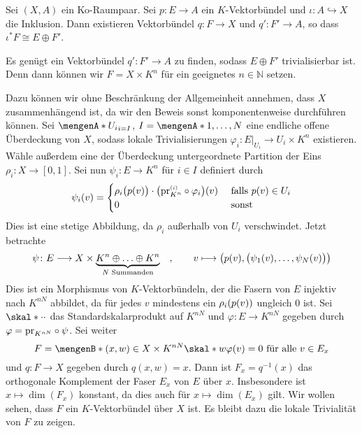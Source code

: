 \begin{lemma}[label=sub:38]
Sei $(X,A)$ ein Ko-Raumpaar. Sei $p \colon E \to A$ ein $K$-Vektorbündel und $\iota \colon A \hookrightarrow X$ die Inklusion. Dann existieren Vektorbündel $q \colon F \to X$
und $q' \colon F' \to A$, so dass $\iota^* F \cong E \oplus F'$.	
\end{lemma}
\begin{beweis}
Es genügt ein Vektorbündel $q' \colon F' \to A $ zu finden, sodass $E \oplus F'$ trivialisierbar ist. 
Denn dann können wir $F = X \times K^n$ für ein geeignetes $n \in \mathds{N}$ setzen.

Dazu können wir ohne Beschränkung der Allgemeinheit annehmen, dass $X$ zusammenhängend ist, da wir den Beweis sonst komponentenweise durchführen können. Sei 
$\set{U_i}_{i=I}$, $I=\set{1,\ldots,N}$ eine endliche offene Überdeckung von $X$, sodass lokale Trivialisierungen $\varphi_i \colon E|_{U_i} \to U_i \times K^n$ existieren. 
Wähle außerdem eine der Überdeckung untergeordnete Partition der Eins $\rho_i \colon X \to [0,1]$. Sei nun $\psi_i \colon E \to K^n$ für $i \in I$ definiert durch
\[
	\psi_i(v) = \begin{cases}
		\rho_i \enbrace[\big]{p(v)} \cdot \enbrace*{\pr_{K^n}^\ssbrace{i} \circ \varphi_i}(v) &\text{ falls }p(v) \in U_i\\
		0 &\text{ sonst}
	\end{cases}
\]
Dies ist eine stetige Abbildung, da $\rho_i$ außerhalb von $U_i$ verschwindet. Jetzt betrachte
\[
	\psi \colon E \longrightarrow X \times \Underbrace{K^n \oplus \ldots \oplus K^n}{N \text{ Summanden}} \quad , \qquad v \longmapsto 
	\enbrace[\big]{p(v), \enbrace[\big]{\psi_1(v), \ldots , \psi_N(v)} } 
\]
Dies ist ein Morphismus von $K$-Vektorbündeln, der die Fasern von $E$ injektiv nach $K^{nN}$ abbildet, da für jedes $v$ mindestens ein $\rho_i \enbrace*{p(v)}$ ungleich $0$
ist. Sei $\skal*{\cdot}{\cdot}$ das Standardskalarprodukt auf $K^{nN}$ und $\varphi \colon E \to K^{nN}$ gegeben durch $\varphi= \pr_{K^{nN}} \circ \psi$. Sei weiter
\[
	F = \set[(x,w) \in X \times K^{nN}]{\skal*{w}{\varphi(v)}=0 \text{ für alle } v \in E_x} 
\]
und $q \colon F \to X$ gegeben durch $q(x,w)=x$. Dann ist $F_x = q ^{-1}(x)$ das orthogonale Komplement der Faser $E_x$ von $E$ über $x$. Insbesondere ist 
$x \mapsto \dim(F_x)$ konstant, da dies auch für $x \mapsto \dim(E_x)$ gilt. Wir wollen sehen, dass $F$ ein $K$-Vektorbündel über $X$ ist. Es bleibt dazu die lokale 
Trivialität von $F$ zu zeigen.


\end{beweis}
